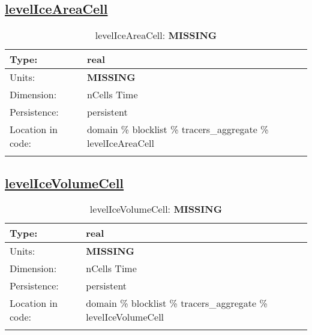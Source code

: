 \subsection[levelIceAreaCell]{\hyperref[sec:var_tab_tracers_aggregate]{levelIceAreaCell}}
\label{subsec:var_sec_tracers_aggregate_levelIceAreaCell}
\begin{center}
\begin{longtable}{| p{2.0in} | p{4.0in} |}
        \hline 
        Type: & real \\
        \hline 
        Units: & {\bf \color{red} MISSING} \\
        \hline 
        Dimension: & nCells Time \\
        \hline 
        Persistence: & persistent \\
        \hline 
         Location in code: & domain \% blocklist \% tracers\_aggregate \% levelIceAreaCell \\
         \hline 
    \caption{levelIceAreaCell: {\bf \color{red} MISSING}}
\end{longtable}
\end{center}
\subsection[levelIceVolumeCell]{\hyperref[sec:var_tab_tracers_aggregate]{levelIceVolumeCell}}
\label{subsec:var_sec_tracers_aggregate_levelIceVolumeCell}
\begin{center}
\begin{longtable}{| p{2.0in} | p{4.0in} |}
        \hline 
        Type: & real \\
        \hline 
        Units: & {\bf \color{red} MISSING} \\
        \hline 
        Dimension: & nCells Time \\
        \hline 
        Persistence: & persistent \\
        \hline 
         Location in code: & domain \% blocklist \% tracers\_aggregate \% levelIceVolumeCell \\
         \hline 
    \caption{levelIceVolumeCell: {\bf \color{red} MISSING}}
\end{longtable}
\end{center}
